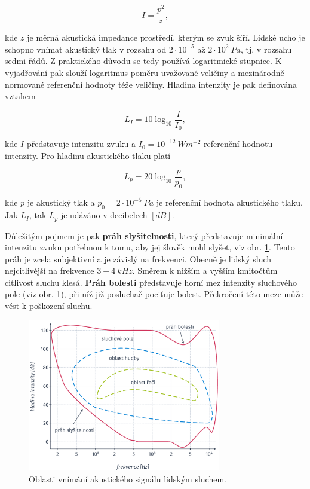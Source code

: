 \begin{equation}
  I = \frac{p^{2}}{z},
  \label{eq:asr:mfcc:intesity}
\end{equation}

\noindent kde $z$ je měrná akustická impedance prostředí, kterým se zvuk šíří. Lidské ucho je schopno vnímat akustický tlak v rozsahu od $2\cdot10^{-5}$ až $2\cdot10^{2}\ Pa$, tj. v rozsahu sedmi řádů. Z praktického důvodu se tedy používá logaritmické stupnice. K vyjadřování pak slouží logaritmus poměru uvažované veličiny a mezinárodně normované referenční hodnoty téže veličiny. \cite{Psutka2006} Hladina intenzity je pak definována vztahem

\begin{equation}
  L_{I} = 10\log_{10}\frac{I}{I_{0}},
  \label{eq:asr:mfcc:intesity:level}
\end{equation}

\noindent kde $I$ představuje intenzitu zvuku a $I_{0} = 10^{-12}\ Wm^{-2}$ referenční hodnotu intenzity. Pro hladinu akustického tlaku platí

\begin{equation}
  L_{p} = 20\log_{10}\frac{p}{p_{0}},
  \label{eq:asr:mfcc:pressure:level}
\end{equation}

\noindent kde $p$ je akustický tlak a $p_{0} = 2\cdot10^{-5}\ Pa$ je referenční hodnota akustického tlaku. Jak $L_{I}$, tak $L_{p}$ je udáváno v decibelech $\left[dB\right]$.

Důležitým pojmem je pak \textbf{práh slyšitelnosti}, který představuje minimální intenzitu zvuku potřebnou k tomu, aby jej šlověk mohl slyšet, viz obr. \ref{fig:asr:mfcc:acoustic:characteristic}. Tento práh je zcela subjektivní a je závislý na frekvenci. Obecně je lidský sluch nejcitlivější na frekvence $3 - 4\ kHz$. Směrem k nižším a vyšším kmitočtům citlivost sluchu klesá. \textbf{Práh bolesti} představuje horní mez intenzity sluchového pole (viz obr. \ref{fig:asr:mfcc:acoustic:characteristic}), při níž již posluchač pociťuje bolest. Překročení této meze může vést k poškození sluchu. \cite{Holmes2001}

\begin{figure}[hbpt]
  \centering
  \includegraphics[width=0.75\textwidth]{./ch4-asr/img/listening_perception.pdf}
  \caption{Oblasti vnímání akustického signálu lidským sluchem.}
  \label{fig:asr:mfcc:acoustic:characteristic}
\end{figure}


